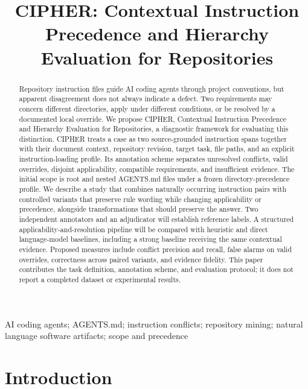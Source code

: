 \documentclass[10pt,conference]{IEEEtran}
\begin{document}
\title{CIPHER: Contextual Instruction Precedence and Hierarchy Evaluation for Repositories}
\author{}
\maketitle

\begin{abstract}
Repository instruction files guide AI coding agents through project conventions, but apparent disagreement does not always indicate a defect. Two requirements may concern different directories, apply under different conditions, or be resolved by a documented local override. We propose CIPHER, Contextual Instruction Precedence and Hierarchy Evaluation for Repositories, a diagnostic framework for evaluating this distinction. CIPHER treats a case as two source-grounded instruction spans together with their document context, repository revision, target task, file paths, and an explicit instruction-loading profile. Its annotation scheme separates unresolved conflicts, valid overrides, disjoint applicability, compatible requirements, and insufficient evidence. The initial scope is root and nested AGENTS.md files under a frozen directory-precedence profile. We describe a study that combines naturally occurring instruction pairs with controlled variants that preserve rule wording while changing applicability or precedence, alongside transformations that should preserve the answer. Two independent annotators and an adjudicator will establish reference labels. A structured applicability-and-resolution pipeline will be compared with heuristic and direct language-model baselines, including a strong baseline receiving the same contextual evidence. Proposed measures include conflict precision and recall, false alarms on valid overrides, correctness across paired variants, and evidence fidelity. This paper contributes the task definition, annotation scheme, and evaluation protocol; it does not report a completed dataset or experimental results.
\end{abstract}

\begin{IEEEkeywords}AI coding agents; AGENTS.md; instruction conflicts; repository mining; natural language software artifacts; scope and precedence\end{IEEEkeywords}

\section{Introduction}
\end{document}
